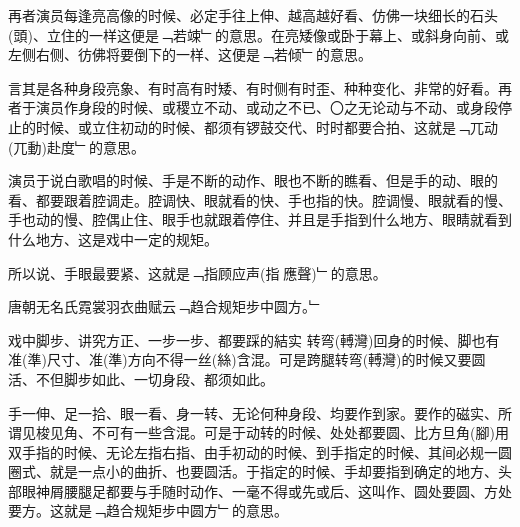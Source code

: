 \documentclass{zhvt-classic}
\begin{document}
再者演员每逢亮高像的时候、必定手往上伸、越高越好看、仿佛一块细长的石头(頭)、立住的一样这便是﹁若竦﹂的意思。在亮矮像或卧于幕上、或斜身向前、或左侧右侧、彷佛将要倒下的一样、这便是﹁若倾﹂的意思。

言其是各种身段亮象、有时高有时矮、有时侧有时歪、种种变化、非常的好看。再者于演员作身段的时候、或稷立不动、或动之不已、〇之无论动与不动、或身段停止的时候、或立住初动的时候、都须有锣鼓交代、时时都要合拍、这就是﹁兀动(兀動)赴度﹂的意思。

演员于说白歌唱的时候、手是不断的动作、眼也不断的瞧看、但是手的动、眼的看、都要跟着腔调走。腔调快、眼就看的快、手也指的快。腔调慢、眼就看的慢、手也动的慢、腔偶止住、眼手也就跟着停住、并且是手指到什么地方、眼睛就看到什么地方、这是戏中一定的规矩。

所以说、手眼最要紧、这就是﹁指顾应声(指𮸹應聲)﹂的意思。

\begin{preface}
  
唐朝无名氏霓裳羽衣曲赋云﹁趋合规矩步中圆方。﹂
\end{preface}

戏中脚步、讲究方正、一步一步、都要踩的結实 转弯(𨍭灣)回身的时候、脚也有准(準)尺寸、准(準)方向不得一丝(絲)含混。可是跨腿转弯(𨍭灣)的时候又要圆活、不但脚步如此、一切身段、都须如此。

手一伸、足一拾、眼一看、身一转、无论何种身段、均要作到家。要作的磁实、所谓见梭见角、不可有一些含混。可是于动转的时候、处处都要圆、比方旦角(腳)用双手指的时候、无论左指右指、由手初动的时候、到手指定的时候、其间必规一圆圈式、就是一点小的曲折、也要圆活。于指定的时候、手却要指到确定的地方、头部眼神屑腰腿足都要与手随时动作、一毫不得或先或后、这叫作、圆处要圆、方处要方。这就是﹁趋合规矩步中圆方﹂的意思。
\end{document}
